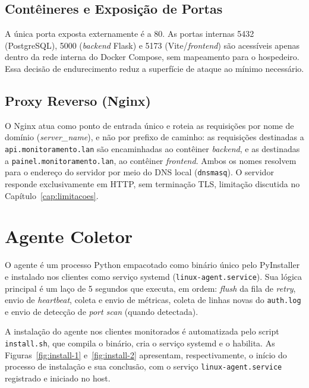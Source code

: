 \documentclass[
    12pt
    ,oneside
    ,a4paper
    ,chapter=TITLE
    ,section=TITLE
    ,sumario=abnt-6027-2012]{abntex2}
\begin{document}
\subsection{Contêineres e Exposição de Portas}

A única porta exposta externamente é a 80. As portas internas 5432 (PostgreSQL),
5000 (\textit{backend} Flask) e 5173 (Vite/\textit{frontend}) são acessíveis apenas
dentro da rede interna do Docker Compose, sem mapeamento para o hospedeiro. Essa
decisão de endurecimento reduz a superfície de ataque ao mínimo necessário.

\subsection{Proxy Reverso (Nginx)}

O Nginx atua como ponto de entrada único e roteia as requisições por nome de
domínio (\textit{server\_name}), e não por prefixo de caminho: as requisições
destinadas a \texttt{api.monitoramento.lan} são encaminhadas ao contêiner
\textit{backend}, e as destinadas a \texttt{painel.monitoramento.lan}, ao contêiner
\textit{frontend}. Ambos os nomes resolvem para o endereço do servidor por meio do
DNS local (\texttt{dnsmasq}). O servidor responde exclusivamente em HTTP, sem
terminação TLS, limitação discutida no Capítulo~\ref{cap:limitacoes}.

\section{Agente Coletor}
\label{sec:agente}

O agente é um processo Python empacotado como binário único pelo PyInstaller e
instalado nos clientes como serviço systemd (\texttt{linux-agent.service}). Sua
lógica principal é um laço de 5 segundos que executa, em ordem: \textit{flush} da
fila de \textit{retry}, envio de \textit{heartbeat}, coleta e envio de métricas,
coleta de linhas novas do \texttt{auth.log} e envio de detecção de
\textit{port scan} (quando detectada).

A instalação do agente nos clientes monitorados é automatizada pelo script \texttt{install.sh}, que compila o binário, cria o serviço systemd e o habilita. As Figuras~\ref{fig:install-1} e~\ref{fig:install-2} apresentam, respectivamente, o início do processo de instalação e sua conclusão, com o serviço \texttt{linux-agent.service} registrado e iniciado no host.

\begin{figure}[H]
\end{figure}
\end{document}
